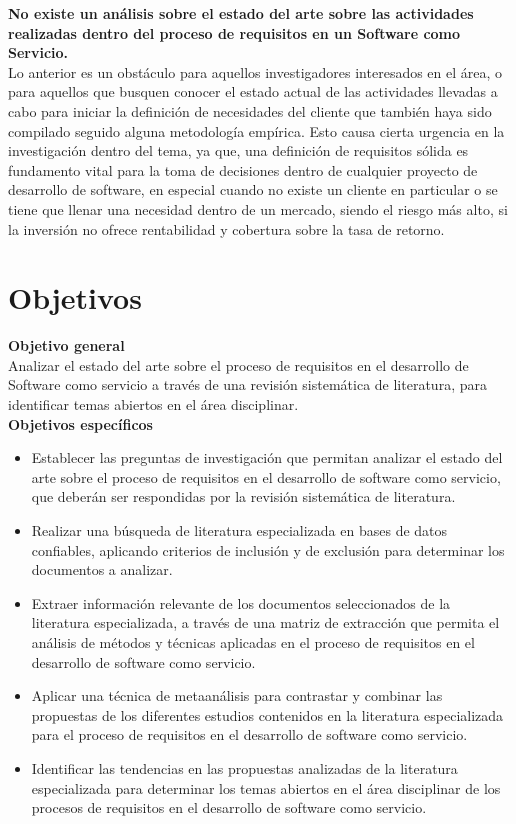 \documentclass{article}
\begin{document}
\textbf{No existe un análisis sobre el estado del arte sobre las actividades realizadas dentro del proceso de requisitos en un Software como Servicio.}\\

Lo anterior es un obstáculo para aquellos investigadores interesados en el área, o para aquellos que busquen conocer el estado actual de las actividades llevadas a cabo para iniciar la definición de 
necesidades del cliente que también haya sido compilado seguido alguna metodología empírica. 
Esto causa cierta urgencia en la investigación dentro del tema, ya que, una definición de requisitos sólida es fundamento vital para la toma de decisiones dentro de cualquier proyecto de desarrollo de software, 
en especial cuando no existe un cliente en particular o se tiene que llenar una necesidad dentro de un mercado, siendo el riesgo más alto, si la inversión no ofrece rentabilidad y cobertura sobre la tasa de retorno. 


\newpage

\section{Objetivos}
\textbf{Objetivo general} \\

Analizar el estado del arte sobre el proceso de requisitos en el desarrollo de Software como servicio a través de una revisión sistemática de literatura, para identificar temas abiertos en el área disciplinar. \\

\textbf{Objetivos específicos} \\

\begin{itemize}
    \item Establecer las preguntas de investigación que permitan analizar el estado del arte sobre el proceso de requisitos en el desarrollo de software como servicio, que deberán ser respondidas por la revisión sistemática de literatura.
    \item Realizar una búsqueda de literatura especializada en bases de datos confiables, aplicando criterios de inclusión y de exclusión para determinar los documentos a analizar.
    \item Extraer información relevante de los documentos seleccionados de la literatura especializada, a través de una matriz de extracción que permita el análisis de métodos y técnicas aplicadas en el proceso de requisitos en el desarrollo de software como servicio.
    \item Aplicar una técnica de metaanálisis para contrastar y combinar las propuestas de los diferentes estudios contenidos en la literatura especializada para el proceso de requisitos en el desarrollo de software como servicio.
    \item Identificar las tendencias en las propuestas analizadas de la literatura especializada para determinar los temas abiertos en el área disciplinar de los procesos de requisitos en el desarrollo de software como servicio.
\end{itemize}
\end{document}
